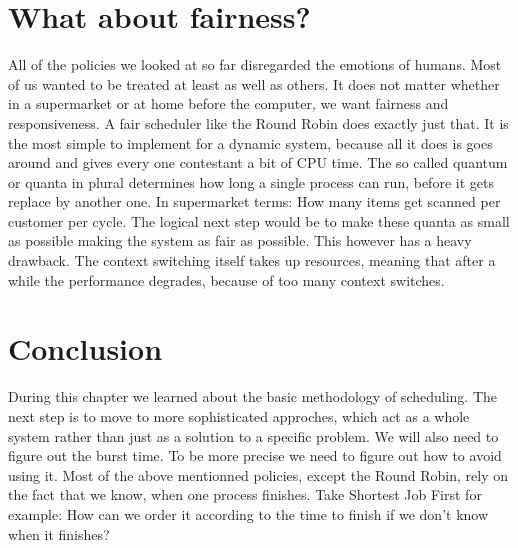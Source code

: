\section{What about fairness?}

All of the policies we looked at so far disregarded the emotions of humans.
Most of us wanted to be treated at least as well as others.
It does not matter whether in a supermarket or at home before the computer, we want fairness and responsiveness.
A fair scheduler like the Round Robin does exactly just that. 
It is the most simple to implement for a dynamic system, because all it does is goes around and gives every one contestant a bit of CPU time.
The so called quantum or quanta in plural determines how long a single process can run, before it gets replace by another one.
In supermarket terms: How many items get scanned per customer per cycle.
The logical next step would be to make these quanta as small as possible making the system as fair as possible.
This however has a heavy drawback.
The context switching itself takes up resources, meaning that after a while the performance degrades, because of too many context switches.



 \section{Conclusion}

During this chapter we learned about the basic methodology of scheduling.
The next step is to move to more sophisticated approches, which act as a whole system rather than just as a solution to a specific problem.
We will also need to figure out the burst time.
To be more precise we need to figure out how to avoid using it.
Most of the above mentionned policies, except the Round Robin, rely on the fact that we know, when one process finishes.
Take Shortest Job First for example: How can we order it according to the time to finish if we don't know when it finishes?